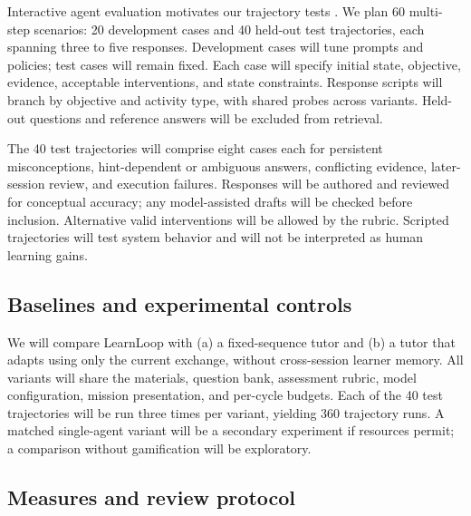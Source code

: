 \documentclass{article}
\begin{document}
Interactive agent evaluation motivates our trajectory tests \citep{ref8}. We plan 60 multi-step scenarios: 20 development cases and 40 held-out test trajectories, each spanning three to five responses. Development cases will tune prompts and policies; test cases will remain fixed. Each case will specify initial state, objective, evidence, acceptable interventions, and state constraints. Response scripts will branch by objective and activity type, with shared probes across variants. Held-out questions and reference answers will be excluded from retrieval.

The 40 test trajectories will comprise eight cases each for persistent misconceptions, hint-dependent or ambiguous answers, conflicting evidence, later-session review, and execution failures. Responses will be authored and reviewed for conceptual accuracy; any model-assisted drafts will be checked before inclusion. Alternative valid interventions will be allowed by the rubric. Scripted trajectories will test system behavior and will not be interpreted as human learning gains.

\subsection{Baselines and experimental controls}

We will compare LearnLoop with (a) a fixed-sequence tutor and (b) a tutor that adapts using only the current exchange, without cross-session learner memory. All variants will share the materials, question bank, assessment rubric, model configuration, mission presentation, and per-cycle budgets. Each of the 40 test trajectories will be run three times per variant, yielding 360 trajectory runs. A matched single-agent variant will be a secondary experiment if resources permit; a comparison without gamification will be exploratory.

\subsection{Measures and review protocol}
\end{document}

